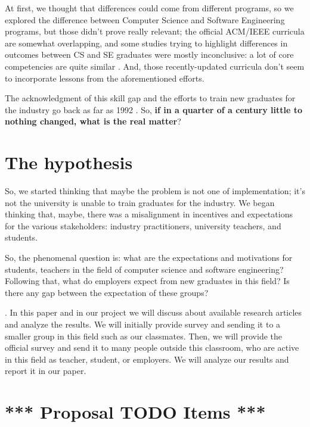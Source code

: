 \documentclass{sigchi}
\begin{document}
At first, we thought that differences could come from different programs, so we explored the difference between Computer Science and Software Engineering programs, but those didn't prove really relevant; the official ACM/IEEE curricula \cite{Force2013} \cite{Ardis2015} are somewhat overlapping, and some studies trying to highlight differences in outcomes between CS and SE graduates were mostly inconclusive: a lot of core competencies are quite similar \cite{Meziane2004} \cite{Rasool2014}. And, those recently-updated curricula don't seem to incorporate lessons from the aforementioned efforts.\newline

The acknowledgment of this skill gap and the efforts to train new graduates for the industry go back as far as 1992 \cite{Dawson1992}. So, \textbf{if in a quarter of a century little to nothing changed, what is the real matter}?

\section*{The hypothesis}
So, we started thinking that maybe the problem is not one of implementation; it's not the university is unable to train graduates for the industry. We began thinking that, maybe, there was a misalignment in incentives and expectations for the various stakeholders: industry practitioners, university teachers, and students.\newline

  So, the phenomenal question is: what are the expectations and motivations for students, teachers in the field of computer science and software engineering? Following that, what do employers expect from new graduates in this field? Is there any gap between the expectation of these groups?
  
  . In this paper and in our project we will discuss about available research articles and analyze the results. We will initially provide survey and sending it to a smaller group in this field such as our classmates. Then, we will provide the official survey and send it to many people outside this classroom, who are active in this field as teacher, student, or employers. We will analyze our results and report it in our paper.


\section{*** Proposal TODO Items ***} 
\end{document}
